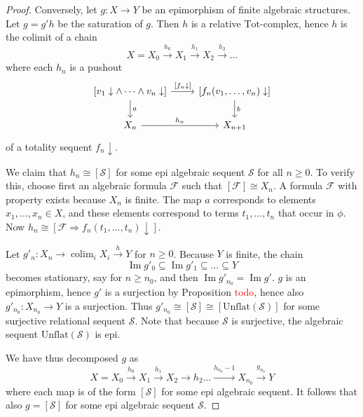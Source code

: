 \documentclass[a4paper]{article}
\newcommand{\todo}[1]{\textcolor{red}{#1}}
\theoremstyle{remark}
\theoremstyle{definition}
\begin{document}
\begin{proof}
  Conversely, let $g : X \rightarrow Y$ be an epimorphism of finite algebraic structures.
  Let $g = g' h$ be the saturation of $g$.
  Then $h$ is a relative $\mathrm{Tot}$-complex, hence $h$ is the colimit of a chain
  \begin{equation}
    X = X_0 \xrightarrow{h_0} X_1 \xrightarrow{h_1} X_2 \xrightarrow{h_2} \dots
  \end{equation}
  where each $h_n$ is a pushout
  \begin{equation}
    \begin{tikzcd}
      \left[ v_1 \downarrow \land \dots \land v_n \downarrow \right] \arrow[r, "{[f_n \downarrow]}"] \arrow[d, "a"] & \left[ f_n(v_1, \dots, v_n) \downarrow \right] \arrow[d, "b"] \\
      X_n \arrow[r, "h_n"] & X_{n + 1}
    \end{tikzcd}
  \end{equation}
  of a totality sequent $f_n \downarrow$.

  We claim that $h_n \cong [\mathcal{S}]$ for some epi algebraic sequent $\mathcal{S}$ for all $n \geq 0$.
  To verify this, choose first an algebraic formula $\mathcal{F}$ such that $[\mathcal{F}] \cong X_n$.
  A formula $\mathcal{F}$ with property exists because $X_n$ is finite.
  The map $a$ corresponds to elements $x_1, \dots, x_n \in X$, and these elements correspond to terms $t_1, \dots, t_n$ that occur in $\phi$.
  Now $h_n \cong [\mathcal{F} \Rightarrow f_n(t_1, \dots, t_n)\downarrow]$.

  Let $g'_n : X_n \rightarrow \operatorname{colim}_i X_i \xrightarrow{h} Y$ for $n \geq 0$.
  Because $Y$ is finite, the chain
  \begin{equation}
    \operatorname{Im} g'_0 \subseteq \operatorname{Im} g'_1 \subseteq \dots \subseteq Y
  \end{equation}
  becomes stationary, say for $n \geq n_0$, and then $\operatorname{Im} g'_{n_0} = \operatorname{Im} g'$.
  $g$ is an epimorphism, hence $g'$ is a surjection by Proposition \todo{todo}, hence also $g'_{n_0} : X_{n_0} \rightarrow Y$ is a surjection.
  Thus $g'_{n_0} \cong [\mathcal{S}] \cong [\mathrm{Unflat}(\mathcal{S})]$ for some surjective relational sequent $\mathcal{S}$.
  Note that because $\mathcal{S}$ is surjective, the algebraic sequent $\mathrm{Unflat}(\mathcal{S})$ is epi.

  We have thus decomposed $g$ as
  \begin{equation}
    X = X_0 \xrightarrow{h_0} X_1 \xrightarrow{h_1} X_2 \rightarrow{h_2} \dots \xrightarrow{h_{n_0} - 1} X_{n_0} \xrightarrow{g_{n_0}} Y
  \end{equation}
  where each map is of the form $[\mathcal{S}]$ for some epi algebraic sequent.
  It follows that also $g = [\mathcal{S}]$ for some epi algebraic sequent $\mathcal{S}$.
\end{proof}
\end{document}
